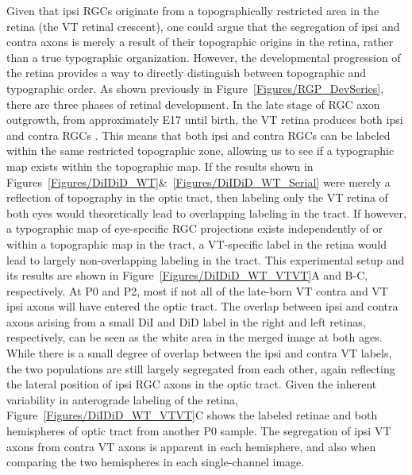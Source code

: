 Given that ipsi RGCs originate from a topographically restricted area in the retina (the VT retinal crescent), one could argue that the segregation of ipsi and contra axons is merely a result of their topographic origins in the retina, rather than a true typographic organization.
However, the developmental progression of the retina provides a way to directly distinguish between topographic and typographic order.
As shown previously in Figure~\ref{Figures/RGP_DevSeries}, there are three phases of retinal development.
In the late stage of RGC axon outgrowth, from approximately E17 until birth, the VT retina produces both ipsi and contra RGCs \cite{drager1985birth}.
This means that both ipsi and contra RGCs can be labeled within the same restricted topographic zone, allowing us to see if a typographic map exists within the topographic map.
If the results shown in Figures~\ref{Figures/DiIDiD_WT}\&~\ref{Figures/DiIDiD_WT_Serial} were merely a reflection of topography in the optic tract, then labeling only the VT retina of both eyes would theoretically lead to overlapping labeling in the tract.
If however, a typographic map of eye-specific RGC projections exists independently of or within a topographic map in the tract, a VT-specific label in the retina would lead to largely non-overlapping labeling in the tract.
This experimental setup and its results are shown in Figure~\ref{Figures/DiIDiD_WT_VTVT}A and B-C, respectively.
At P0 and P2, most if not all of the late-born VT contra and VT ipsi axons will have entered the optic tract.
The overlap between ipsi and contra axons arising from a small DiI and DiD label in the right and left retinas, respectively, can be seen as the white area in the merged image at both ages.
While there is a small degree of overlap between the ipsi and contra VT labels, the two populations are still largely segregated from each other, again reflecting the lateral position of ipsi RGC axons in the optic tract.
Given the inherent variability in anterograde labeling of the retina, Figure~\ref{Figures/DiIDiD_WT_VTVT}C shows the labeled retinae and both hemispheres of optic tract from another P0 sample.
The segregation of ipsi VT axons from contra VT axons is apparent in each hemisphere, and also when comparing the two hemispheres in each single-channel image.


